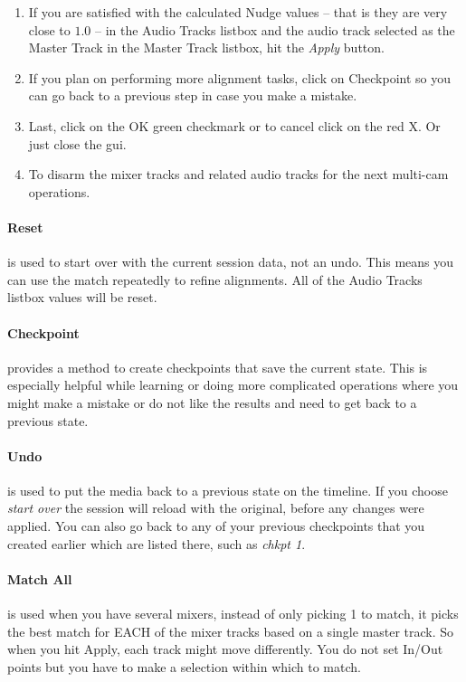 \begin{enumerate}
    \item If you are satisfied with the calculated Nudge values -- that is they are very close to $1.0$ -- in the Audio Tracks listbox and the audio track selected as the Master Track in the Master Track listbox, hit the \textit{Apply} button.
    \item If you plan on performing more alignment tasks, click on Checkpoint so you can go back to a previous step in case you make a mistake.
    \item Last, click on the OK green checkmark or to cancel click on the red X.  Or just close the gui.
    \item To disarm the mixer tracks and related audio tracks for the next multi-cam operations.
\end{enumerate}

\paragraph{Reset} is used to start over with the current session data, not an undo.  This means you can use the match repeatedly to refine alignments.  All of the Audio Tracks listbox values will be reset.

\paragraph{Checkpoint} provides a method to create checkpoints that save the current state.  This is especially helpful while learning or doing more complicated operations where you might make a mistake or do not like the results and need to get back to a previous state.

\paragraph{Undo} is used to put the media back to a previous state on the timeline.  If you choose \textit{start over} the session will reload with the original, before any changes were applied.  You can also go back to any of your previous checkpoints that you created earlier which are listed there, such as \textit{chkpt 1}.

\paragraph{Match All}is used when you have several mixers, instead of only picking 1 to match, it picks the best match for EACH of the mixer tracks based on a single master track. So when you hit Apply, each track might move differently. You do not set In/Out points but you have to make a selection within which to match.

